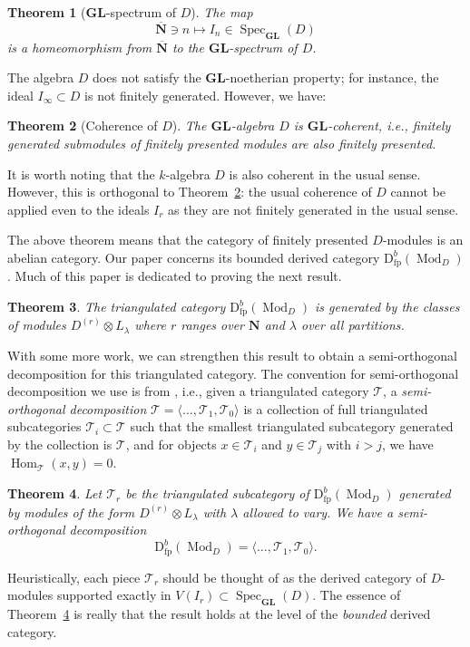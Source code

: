 \documentclass[12pt]{amsart}
\newcommand{\rD}{\mathrm{D}}
\newcommand{\bN}{\mathbf{N}}
\newcommand{\cT}{\mathcal{T}}
\DeclareMathOperator{\Spec}{Spec}
\DeclareMathOperator{\Hom}{Hom}
\DeclareMathOperator{\Mod}{Mod}
\DeclareMathOperator{\fpre}{fp}
\newcommand{\Dr}{D^{(r)}}
\newcommand{\GL}{\mathbf{GL}}
\numberwithin{equation}{section}
\theoremstyle{definition}
\theoremstyle{plain}
\newtheorem{mainthm}{Theorem}
\begin{document}
\begin{mainthm}[$\GL$-spectrum of $D$]\label{thm:introspec}
    The map 
    $$\overline{\bN} \ni n \mapsto I_n \in \Spec_{\GL}(D)$$
    is a
    homeomorphism from $\overline{\bN}$ to the $\GL$-spectrum of $D$.
\end{mainthm}

The algebra $D$ does not satisfy the $\GL$-noetherian property; for instance, the ideal $I_{\infty} \subset D$ is not finitely generated. However, we have:
\begin{mainthm}[Coherence of $D$]\label{thm:coherence}
    The $\GL$-algebra $D$ is $\GL$-coherent, i.e., finitely generated submodules of finitely presented modules are also finitely presented. 
\end{mainthm}
It is worth noting that the $k$-algebra $D$ is also coherent in the usual sense. However, this is orthogonal to Theorem~\ref{thm:coherence}: the usual coherence of $D$ cannot be applied even to the ideals $I_r$ as they are not finitely generated in the usual sense.

The above theorem means that the category of finitely presented $D$-modules is an abelian category. Our paper concerns its bounded derived category $\rD^b_{\fpre}(\Mod_D)$. Much of this paper is dedicated to proving the next result. 
\begin{mainthm}\label{thm:gensdbmodintro}
       The triangulated category $\rD^b_{\fpre}(\Mod_D)$ is generated by the classes of modules $\Dr \otimes L_{\lambda}$ where $r$ ranges over $\bN$ and $\lambda$ over all partitions.
\end{mainthm}
With some more work, we can strengthen this result to obtain a semi-orthogonal decomposition for this triangulated category. The convention for semi-orthogonal decomposition we use is from \cite[Section~4]{ss19gl2}, i.e., given a triangulated category $\cT$, a \textit{semi-orthogonal decomposition} $\cT = \langle \ldots, \cT_1, \cT_0 \rangle$ is a collection of full triangulated subcategories $\cT_i \subset \cT$ such that the smallest triangulated subcategory generated by the collection is $\cT$, and for objects $x \in \cT_i$ and $y \in \cT_j$ with $i > j$, we have $\Hom_{\cT}(x, y) = 0$. 
\begin{mainthm}\label{thm:introsod}
Let $\cT_r$ be the triangulated subcategory of $\rD^b_{\fpre}(\Mod_D)$ generated by modules of the form $\Dr \otimes L_{\lambda}$ with $\lambda$ allowed to vary. We have a semi-orthogonal decomposition
\[
\rD^b_{\fpre}(\Mod_D) = \langle \ldots, \cT_1, \cT_0 \rangle.
\]
\end{mainthm}
Heuristically, each piece $\cT_r$ should be thought of as the derived category of $D$-modules supported exactly in $V(I_r) \subset \Spec_{\GL}(D)$. The essence of Theorem~\ref{thm:introsod} is really that the result holds at the level of the \textit{bounded} derived category. 
\end{document}
